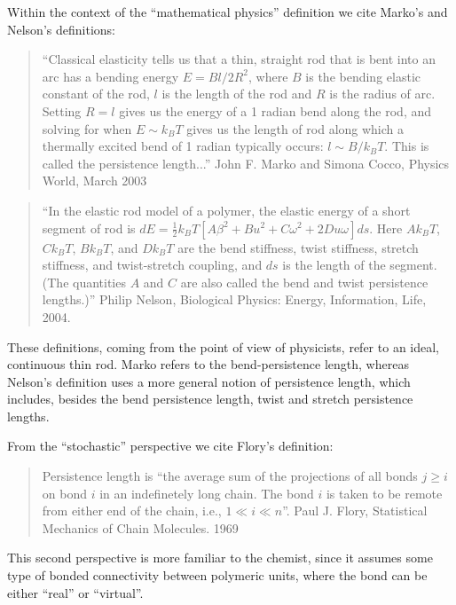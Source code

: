 Within the context of  the ``mathematical physics'' definition we cite
Marko's and Nelson's definitions:

\begin{quotation}
``Classical elasticity tells us that a thin, straight rod that is bent
into an arc has a bending energy $E=Bl/2R^2$, where $B$ is the bending
elastic constant of the  rod, $l$ is the length of the  rod and $R$ is
the radius  of arc. Setting  $R=l$ gives us  the energy of a  1 radian
bend along the rod, and solving  for when $E \sim k_{B}T$ gives us the
length  of  rod along  which  a thermally  excited  bend  of 1  radian
typically occurs:  $l \sim B/k_{B}T$.  This is  called the persistence
length...'' John F. Marko and Simona Cocco, Physics World, March 2003
\end{quotation}

\begin{quotation}
``In the elastic rod model of a polymer, the elastic energy of a short
  segment       of      rod       is       $dE=\frac{1}{2}      k_{B}T
  [A\beta^2+Bu^2+C\omega^2+2Du\omega] ds$.  Here $Ak_{B}T$, $Ck_{B}T$,
  $Bk_{B}T$, and  $Dk_{B}T$ are  the bend stiffness,  twist stiffness,
  stretch  stiffness,  and twist-stretch  coupling,  and  $ds$ is  the
  length of the segment.  (The  quantities $A$ and $C$ are also called
  the   bend  and  twist   persistence  lengths.)''    Philip  Nelson,
  Biological Physics: Energy, Information, Life, 2004.
\end{quotation}

These definitions, coming from the  point of view of physicists, refer
to   an   ideal,  continuous   thin   rod.    Marko   refers  to   the
bend-persistence  length,  whereas  Nelson's  definition uses  a  more
general notion of persistence length, which includes, besides the bend
persistence length, twist and stretch persistence lengths.

From the ``stochastic'' perspective we cite Flory's definition:

\begin{quotation}
Persistence  length is  ``the average  sum of  the projections  of all
bonds $ j \geq i$ on bond $i$ in an indefinetely long chain.  The bond
$i$ is taken to be remote from either end of the chain, i.e., $1 \ll i
\ll   n$''.   Paul   J.   Flory,  Statistical   Mechanics   of   Chain
Molecules. 1969
\end{quotation}


This  second perspective  is more  familiar to  the chemist,  since it
assumes  some type  of  bonded connectivity  between polymeric  units,
where the bond can be either ``real'' or ``virtual''.

